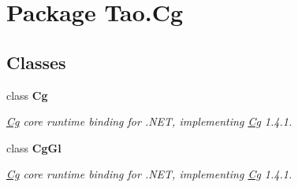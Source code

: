 \hypertarget{namespace_tao_1_1_cg}{
\section{Package Tao.Cg}
\label{namespace_tao_1_1_cg}
}
\subsection*{Classes}
\begin{DoxyCompactItemize}
\item 
class {\bfseries Cg}
\begin{DoxyCompactList}\small\item\em \hyperlink{namespace_tao_1_1_cg}{Cg} core runtime binding for .NET, implementing \hyperlink{namespace_tao_1_1_cg}{Cg} 1.4.1. \item\end{DoxyCompactList}\item 
class {\bfseries CgGl}
\begin{DoxyCompactList}\small\item\em \hyperlink{namespace_tao_1_1_cg}{Cg} core runtime binding for .NET, implementing \hyperlink{namespace_tao_1_1_cg}{Cg} 1.4.1. \item\end{DoxyCompactList}\end{DoxyCompactItemize}
